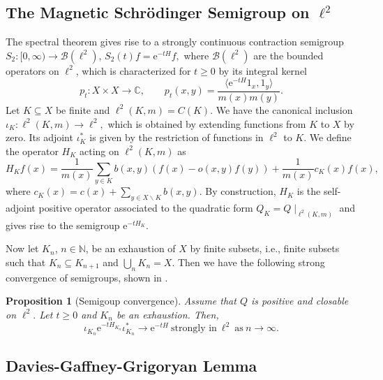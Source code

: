 \documentclass[10pt]{amsart}
\newtheorem{proposition}[theorem]{Proposition}
\theoremstyle{definition}
\begin{document}
\subsection{The Magnetic Schrödinger Semigroup on $\ell^2$}
The spectral theorem gives rise to a strongly continuous contraction semigroup $S_2:[0,\infty)\rightarrow\mathcal{B}(\ell^2)$, $S_2 (t)f = \mathrm{e}^{-t H} f,$ where $\mathcal{B}(\ell^2)$ are the bounded operators on $\ell^2$, which is characterized for $t\geq 0$ by its integral kernel
 \[p_t: X \times X\rightarrow\mathbb{C},\qquad p_t(x,y) = \frac{\langle\mathrm{e}^{-tH} 1_x,1_y\rangle}{m(x)m(y)}.\]
Let $K\subseteq X$ be finite and $\ell^2(K,m) = C(K).$
We have the canonical inclusion $\iota_K:\ell^2(K,m)\rightarrow\ell^2,$ which is obtained by extending functions from $K$ to $ X$ by zero. Its adjoint $\iota^*_K$ is given by the restriction of functions in $\ell^2$ to $K.$ We define the operator $H_K$ acting on $\ell^2(K,m)$ as 
\[H_K f( x) = \frac{1}{m( x)}\sum_{ y\in K}b( x, y)\left( f( x)-o( x, y) f( y)\right)+\frac{1}{m( x)}c_K( x) f( x),\]
where $
c_K( x)= c( x)+\sum_{ y\in X\backslash K}b( x, y) .$
By construction, $H_K$ is the self-adjoint positive operator associated to the quadratic form $Q_K = Q\mid_{\ell^2(K,m)}$ and gives rise to the semigroup $\mathrm{e}^{-tH_K}.$ 

Now let $K_n$, $n\in\mathbb{N}$, be an exhaustion of $ X$ by finite subsets, i.e., finite subsets such that $K_n\subseteq K_{n+1}$ and $\bigcup_{n}K_n =  X.$ Then we have the following strong convergence of semigroups, shown in \cite[Proposition~2.20]{GKS}.
\begin{proposition}[Semigoup convergence]\label{semiconv} Assume that $Q$ is positive and closable on $\ell^2.$
    Let $t\geq 0$ and $K_n$ be an exhaustion. Then,
    \[\iota_{K_n}\mathrm{e}^{-t{H}_{K_n}}\iota_{K_n}^*\rightarrow\mathrm{e}^{-t H}~\text{strongly in}~\ell^2~\text{as}~n\rightarrow\infty.\]
\end{proposition}



\subsection{Davies-Gaffney-Grigoryan Lemma}
\end{document}
